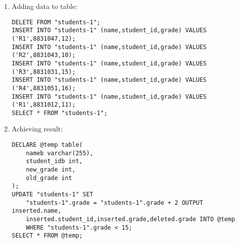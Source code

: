 \documentclass{article}
\begin{document}
\begin{enumerate}
	\begin{enumerate}
		\item Adding data to table:
			\begin{verbatim}
DELETE FROM "students-1";
INSERT INTO "students-1" (name,student_id,grade) VALUES ('R1',8831047,12);
INSERT INTO "students-1" (name,student_id,grade) VALUES ('R2',8831043,10);
INSERT INTO "students-1" (name,student_id,grade) VALUES ('R3',8831031,15);
INSERT INTO "students-1" (name,student_id,grade) VALUES ('R4',8831051,16);
INSERT INTO "students-1" (name,student_id,grade) VALUES ('R1',8831012,11);
SELECT * FROM "students-1";
			\end{verbatim}
		\item Achieving result:
			\begin{verbatim}
DECLARE @temp table(
	nameb varchar(255),
	student_idb int,
	new_grade int,
	old_grade int
);
UPDATE "students-1" SET 
	"students-1".grade = "students-1".grade + 2 OUTPUT inserted.name,
	inserted.student_id,inserted.grade,deleted.grade INTO @temp
	WHERE "students-1".grade < 15;
SELECT * FROM @temp;
			\end{verbatim}
	\end{enumerate}
\end{enumerate}
\end{document}
